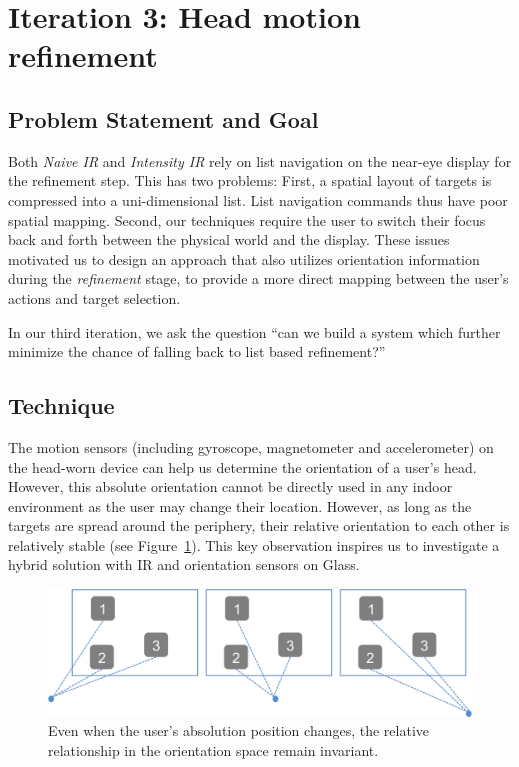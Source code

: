 \section{Iteration 3: Head motion refinement}
\label{sec:iteration-3:-head}
\subsection{Problem Statement and Goal}
Both {\em Naive IR} and {\em Intensity IR} rely on list navigation on the near-eye display for the refinement step. This has two problems: First, a spatial layout of targets is compressed into a uni-dimensional list. List navigation commands thus have poor spatial mapping. Second, our techniques require the user to switch their focus back and forth between the physical world and the display. These issues motivated us to design an approach that also utilizes orientation information during the {\em refinement} stage, to provide a more direct mapping between the user's actions and target selection.

In our third iteration, we ask the question ``can we build a system which further minimize the chance of falling back to list based refinement?''

\subsection{Technique}
The motion sensors (including gyroscope, magnetometer and accelerometer) on the head-worn device can help us determine the orientation of a user's head. However, this absolute orientation cannot be directly used in any indoor environment as the user may change their location. However, as long as the targets are spread around the periphery, their relative orientation to each other is relatively stable (see Figure~\ref{fig:third_principle}). This key observation inspires us to investigate a hybrid solution with IR and orientation sensors on Glass.

\begin{figure}[t]
\centering
\includegraphics[width=1\columnwidth]{figures/third_principle.png}
\caption{Even when the user's absolution position changes, the relative relationship in the orientation space remain invariant.}
\label{fig:third_principle}
\end{figure}

